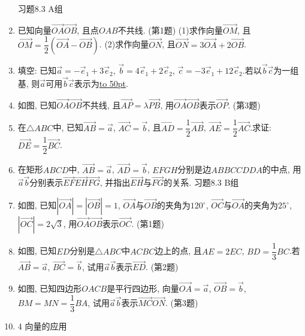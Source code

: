 \documentclass[10pt,a4paper]{article}
\newcommand{\blank}[1]{\underline{\hbox to #1pt{}}}
\begin{document}
\begin{enumerate}[1.]
习题8.3  A组
\item 已知向量$\overrightarrow {OA}\overrightarrow {OB}$, 且点$OAB$不共线.
(第1题)
(1)求作向量$\overrightarrow {OM}$, 且$\overrightarrow {OM}=\dfrac 12(\overrightarrow {OA}-\overrightarrow {OB})$.
(2)求作向量$\overrightarrow {ON}$, 且$\overrightarrow {ON}=3\overrightarrow {OA}+2\overrightarrow {OB}$.
\item 填空:
已知$\overrightarrow a=-\overrightarrow e_1+3\overrightarrow e_2$, $\overrightarrow b=4\overrightarrow e_1+2\overrightarrow e_2$, $\overrightarrow c=-3\overrightarrow e_1+12\overrightarrow e_2$.若以$\overrightarrow b\overrightarrow c$为一组基, 则$\overrightarrow a$可用$\overrightarrow b\overrightarrow c$表示为\blank{50}.
\item 如图, 已知$\overrightarrow {OA}\overrightarrow {OB}$不共线, 且$\overrightarrow {AP}=\lambda \overrightarrow {PB}$, 用$\overrightarrow {OA}\overrightarrow {OB}$表示$\overrightarrow {OP}$.
(第3题)
\item 在$\triangle ABC$中, 已知$\overrightarrow {AB}=\overrightarrow a$, $\overrightarrow {AC}=\overrightarrow b$, 且$\overrightarrow {AD}=\dfrac 12\overrightarrow {AB}$, $\overrightarrow {AE}=\dfrac 12\overrightarrow {AC}$.求证: $\overrightarrow {DE}=\dfrac 12\overrightarrow {BC}$.
\item 在矩形$ABCD$中, $\overrightarrow {AB}=\overrightarrow a$, $\overrightarrow {AD}=\overrightarrow b$, $EFGH$分别是边$ABBCCDDA$的中点, 用$\overrightarrow a\overrightarrow b$分别表示$\overrightarrow {EF}\overrightarrow {EH}\overrightarrow {FG}$, 并指出$\overrightarrow {EH}$与$\overrightarrow {FG}$的关系.
习题8.3  B组
\item 如图, 已知$|\overrightarrow {OA}|=|\overrightarrow {OB}|=1$, $\overrightarrow {OA}$与$\overrightarrow {OB}$的夹角为$120^{\circ }$, $\overrightarrow {OC}$与$\overrightarrow {OA}$的夹角为$25^{\circ }$, $|\overrightarrow {OC}|=2\sqrt 3$, 用$\overrightarrow {OA}\overrightarrow {OB}$表示$\overrightarrow {OC}$.
(第1题)
\item 如图, 已知$ED$分别是$\triangle ABC$中$ACBC$边上的点, 且$AE=2EC$, $BD=\dfrac 13BC$.若$\overrightarrow {AB}=\overrightarrow a$, $\overrightarrow {BC}=\overrightarrow b$, 试用$\overrightarrow a\overrightarrow b$表示$\overrightarrow {ED}$.
(第2题)
\item 如图, 已知四边形$OACB$是平行四边形, 向量$\overrightarrow {OA}=\overrightarrow a$, $\overrightarrow {OB}=\overrightarrow b$, $BM=MN=\dfrac 13BA$, 试用$\overrightarrow a\overrightarrow b$表示$\overrightarrow {MC}\overrightarrow {ON}$.
(第3题)
\item 4  向量的应用

\end{enumerate}
\end{document}
